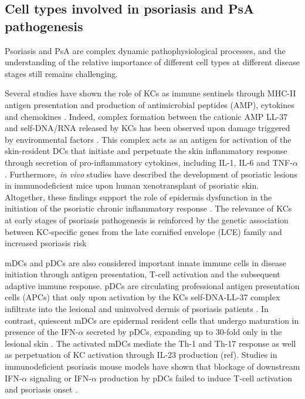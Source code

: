 \subsection{Cell types involved in psoriasis and PsA pathogenesis}

Psoriasis and PsA are complex dynamic pathophysiological processes, and the understanding of the relative importance of different cell types at different disease stages still remains challenging.

Several studies have shown the role of KCs as immune sentinels through MHC-II antigen presentation and production of antimicrobial peptides (AMP), cytokines and chemokines \parencite{Black2007}. Indeed, complex formation between the cationic AMP LL-37 and self-DNA/RNA released by KCs has been observed upon damage triggered by environmental factors \parencite{Lande2007}. This complex acts as an antigen for activation of the skin-resident DCs that initiate and perpetuate the skin inflammatory response through secretion of pro-inflammatory cytokines, including IL-1, IL-6 and TNF-$\alpha$ \parencite{Feldmeyer2007, Arend2008, Nestle2009, Nestle2005}. Furthermore, \textit{in vivo} studies have described the development of psoriatic lesions in immunodeficient mice upon human xenotransplant of psoriatic skin\parencite{Boyman2004}. Altogether, these findings support the role of epidermis dysfunction in the initiation of the psoriatic chronic inflammatory response \parencite{Proskch2008}.  The relevance of KCs at early stages of psoriasis pathogenesis is reinforced by the genetic association between KC-specific genes from the late cornified envelope (LCE) family and increased psoriasis risk \parencite{Tsoi2012}

mDCs and pDCs are also considered important innate immune cells in disease initiation through antigen presentation, T-cell activation and the subsequent adaptive immune response\parencite{Mahil20016}. pDCs are circulating professional antigen presentation cells (APCs) that only upon activation by the KCs self-DNA-LL-37 complex infiltrate into the lesional and uninvolved dermis of psoriasis patients \parencite{Nestle2005, Lande2007}. In contrast, quiescent mDCs are epidermal resident cells that undergo maturation in presence of the IFN-$\alpha$ secreted by pDCs, expanding up to 30-fold only in the lesional skin \parencite{Zaba2007}. The activated mDCs mediate the Th-1 and Th-17 response as well as perpetuation of KC activation through IL-23 production (ref). Studies in immunodeficient psoriasis mouse models have shown that blockage of downstream IFN-$\alpha$ signaling or IFN-$\alpha$ production by pDCs failed to induce T-cell activation and psoriasis onset \parencite{Nestle2005}. 


